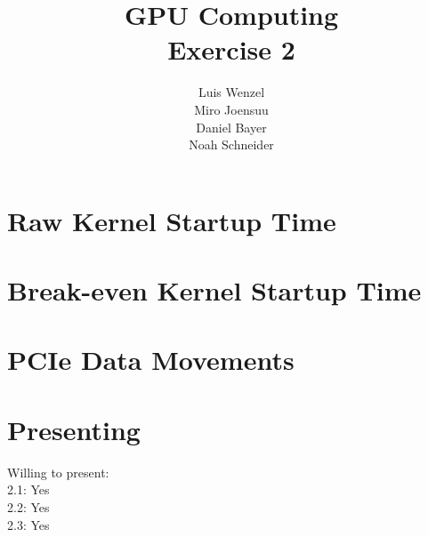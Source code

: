 \documentclass[12pt,twoside,a4paper]{article}
\title{GPU Computing\\
Exercise 2}
\author{
  Luis Wenzel\\
  Miro Joensuu\\
  Daniel Bayer\\
  Noah Schneider
}
\date{}
\begin{document}
\maketitle
\section{Raw Kernel Startup Time}


\section{Break-even Kernel Startup Time}
	

\section{PCIe Data Movements}

\FloatBarrier

\section{Presenting}
Willing to present:\\
2.1: Yes\\
2.2: Yes\\
2.3: Yes
\end{document}

